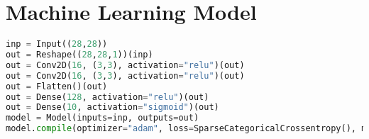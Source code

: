 \appendix

\chapter{Machine Learning Model} \label{ap:model}
\begin{lstlisting}[language=Python]
inp = Input((28,28))
out = Reshape((28,28,1))(inp)
out = Conv2D(16, (3,3), activation="relu")(out)
out = Conv2D(16, (3,3), activation="relu")(out)
out = Flatten()(out)
out = Dense(128, activation="relu")(out)
out = Dense(10, activation="sigmoid")(out)
model = Model(inputs=inp, outputs=out)
model.compile(optimizer="adam", loss=SparseCategoricalCrossentropy(), metrics=[SparseCategoricalAccuracy()])
\end{lstlisting}